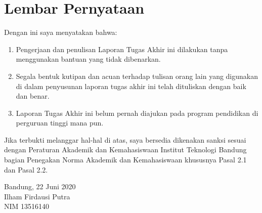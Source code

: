 \clearpage

\chapter*{Lembar Pernyataan}

Dengan ini saya menyatakan bahwa:

\begin{enumerate}

    \item Pengerjaan dan penulisan Laporan Tugas Akhir ini dilakukan tanpa menggunakan bantuan yang tidak dibenarkan.
    \item Segala bentuk kutipan dan acuan terhadap tulisan orang lain yang digunakan di dalam penyusunan laporan tugas akhir ini telah dituliskan dengan baik dan benar.
    \item Laporan Tugas Akhir ini belum pernah diajukan pada program pendidikan di perguruan tinggi mana pun.

\end{enumerate}

Jika terbukti melanggar hal-hal di atas, saya bersedia dikenakan sanksi sesuai dengan Peraturan Akademik dan Kemahasiswaan Institut Teknologi Bandung bagian Penegakan Norma Akademik dan Kemahasiswaan khususnya Pasal 2.1 dan Pasal 2.2.
\vspace{15mm}



\begin{flushright} 
    Bandung, 22 Juni 2020 \\
    \vskip 0.5in
    Ilham Firdausi Putra \\
    NIM 13516140
\end{flushright}

\clearpage